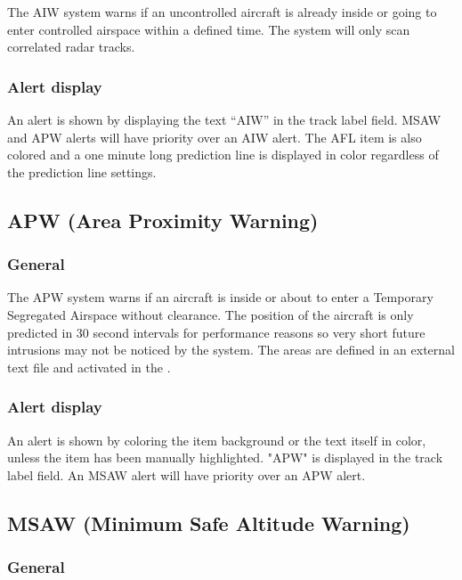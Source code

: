 \documentclass[a4paper,oneside,11pt]{memoir}
\begin{document}
The AIW system warns if an uncontrolled aircraft is already inside or going to enter controlled airspace within a defined time. The system will only scan correlated radar tracks.

\subsubsection*{Alert display}

An alert is shown by displaying the text “AIW” in the  track label field. MSAW and APW alerts will have priority over an AIW alert. The AFL item is also colored  and a one minute long prediction line is displayed in  color regardless of the prediction line settings.

\subsection{APW (Area Proximity Warning)}
\label{tool:APW}
\subsubsection*{General}

The APW system warns if an aircraft is inside or about to enter a Temporary Segregated Airspace without clearance. The position of the aircraft is only predicted in 30 second intervals for performance reasons so very short future intrusions may not be noticed by the system. The areas are defined in an external text file and activated in the .

\subsubsection*{Alert display}

An alert is shown by coloring the  item background or the text itself in  color, unless the  item has been manually highlighted. "APW" is displayed in the  track label field. An MSAW alert will have priority over an APW alert.

\subsection{MSAW (Minimum Safe Altitude Warning)}
\label{tool:MSAW}
\subsubsection*{General}
\end{document}
